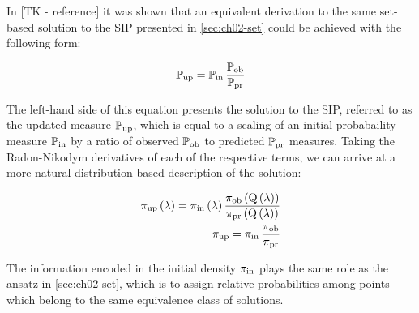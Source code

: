 In [TK - reference] it was shown that an equivalent derivation to the same set-based solution to the SIP presented in \ref{sec:ch02-set} could be achieved with the following form:

\begin{equation}
\dciP
\end{equation}


The left-hand side of this equation presents the solution to the SIP, referred to as the updated measure $\updatedP$, which is equal to a scaling of an initial probabaility measure $\initialP$ by a ratio of observed $\observedP$ to predicted $\predictedP$ measures.
Taking the Radon-Nikodym derivatives of each of the respective terms, we can arrive at a more natural distribution-based description of the solution:

\begin{equation}\label{eq:updated-density}
\begin{split}
\dci\\
\dciD
\end{split}
\end{equation}

The information encoded in the initial density $\initial$ plays the same role as the ansatz in \ref{sec:ch02-set}, which is to assign relative probabilities among points which belong to the same equivalence class of solutions.
